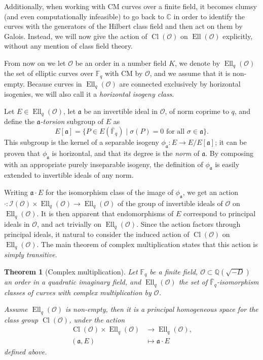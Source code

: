 \documentclass[10pt]{article}
\theoremstyle{plain}
\newtheorem{theorem}{Theorem}
\theoremstyle{definition}
\DeclareMathOperator{\Cl}{Cl}
\DeclareMathOperator{\Ell}{Ell}
\def\F{\ensuremath{\mathbb{F}}}
\def\O{\ensuremath{\mathcal{O}}}
\def\a{\ensuremath{\mathfrak{a}}}
\begin{document}
Additionally, when working with CM curves over a finite field, it
becomes clumsy (and even computationally infeasible) to go back to $ℂ$
in order to identify the curves with the generators of the Hilbert
class field and then act on them by Galois. %
Instead, we will now give the action of $\Cl(\O)$ on $\Ell(\O)$
explicitly, without any mention of class field theory. %

From now on we let $\O$ be an order in a number field $K$, we denote
by $\Ell_q(\O)$ the set of elliptic curves over $\F_q$ with CM by
$\O$, and we assume that it is non-empty. %
Because curves in $\Ell_q(\O)$ are connected exclusively by horizontal
isogenies, we will also call it a \emph{horizontal isogeny class}.

Let $E∈\Ell_q(\O)$, let $\a$ be an invertible ideal in $\O$, of norm
coprime to $q$, and define the \emph{${\a}$-torsion} subgroup of $E$
as
\begin{equation*}
  \label{eq:a-torsion}
  E[\a] = \{P ∈ E(\bar{\F}_q) \mid σ(P) = 0
  \text{ for all } σ ∈ \a \}.
\end{equation*}
This subgroup is the kernel of a separable isogeny
$\phi_{\a}:E→E/E[\a]$; it can be proven that $\phi_{\a}$ is
horizontal, and that its degree is the \emph{norm} of $\a$. %
By composing with an appropriate purely inseparable isogeny, the
definition of $ϕ_\a$ is easily extended to invertible ideals of any
norm.

Writing $\a·E$ for the isomorphism class of the image of $ϕ_\a$, we
get an action $·:\mathcal{I}(\O)×\Ell_q(\O)→\Ell_q(\O)$ of the group
of invertible ideals of $\O$ on $\Ell_q(\O)$. %
It is then apparent that endomorphisms of $E$ correspond to principal
ideals in $\O$, and act trivially on $\Ell_q(\O)$. %
Since the action factors through principal ideals, it natural to
consider the induced action of $\Cl(\O)$ on $\Ell_q(\O)$. %
The main theorem of complex multiplication states that this action is
\emph{simply transitive}. %

\begin{theorem}[Complex multiplication]
  Let $\F_q$ be a finite field, $\O⊂ℚ(\sqrt{-D})$ an order in a
  quadratic imaginary field, and $\Ell_q(\O)$ the set of
  $\bar{\F}_q$-isomorphism classes of curves with complex
  multiplication by $\O$. %

  Assume $\Ell_q(\O)$ is non-empty, then it is a \emph{principal
    homogeneous space} for the class group $\Cl(\O)$, under the action
  \begin{align*}
    \Cl(\O) × \Ell_q(\O) &→ \Ell_q(\O),\\
    (\a,E)  &↦ \a·E
  \end{align*}
  defined above.
\end{theorem}
\end{document}
